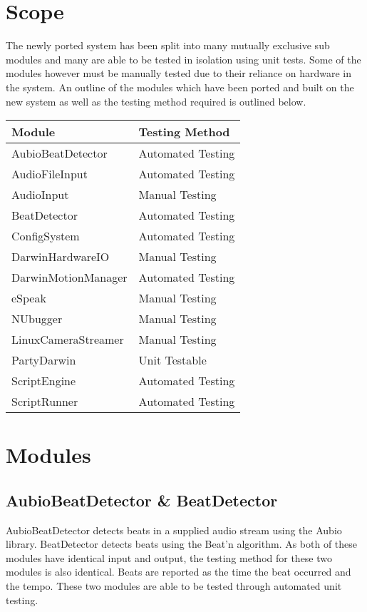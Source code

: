 \documentclass[english,12pt]{scrartcl}
\begin{document}
\section{Scope}
	The newly ported system has been split into many mutually exclusive sub modules and many are able to be tested in isolation using unit tests.
	Some of the modules however	must be manually tested due to their reliance on hardware in the system.
	An outline of the modules which have been ported and built on the new system as well as the testing method required is outlined below.
	\begin{tabular}{|p{7cm}|p{7cm}|}
		\hline \textbf{\large Module} & \textbf{\large Testing Method} \\ \hline
		AubioBeatDetector     & Automated Testing  \\ \hline
		AudioFileInput        & Automated Testing  \\ \hline
		AudioInput            & Manual Testing     \\ \hline
		BeatDetector          & Automated Testing  \\ \hline
		ConfigSystem          & Automated Testing  \\ \hline
		DarwinHardwareIO      & Manual Testing     \\ \hline
		DarwinMotionManager   & Automated Testing  \\ \hline
		eSpeak                & Manual Testing     \\ \hline
		NUbugger              & Manual Testing     \\ \hline
		LinuxCameraStreamer   & Manual Testing     \\ \hline
		PartyDarwin           & Unit Testable      \\ \hline
		ScriptEngine          & Automated Testing  \\ \hline
		ScriptRunner          & Automated Testing  \\ \hline
	\end{tabular}
	
\section{Modules}
	\subsection{AubioBeatDetector \& BeatDetector}
		AubioBeatDetector detects beats in a supplied audio stream using the Aubio library.
		BeatDetector detects beats using the Beat'n algorithm.
		As both of these modules have identical input and output, the testing method for these two modules is also identical.
		Beats are reported as the time the beat occurred and the tempo.
		These two modules are able to be tested through automated unit testing.
		
\end{document}
